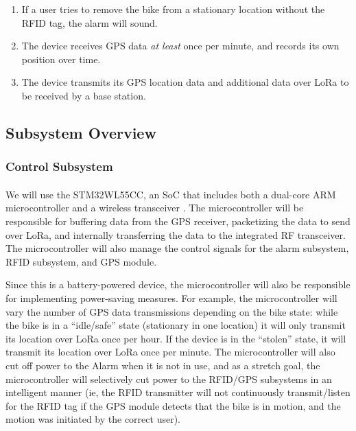\documentclass{article}
\begin{document}
\begin{enumerate}
	\item If a user tries to remove the bike from a stationary location without the RFID tag, the alarm will sound. 
	
	\item The device receives GPS data \textit{at least} once per minute, and records its own position over time.  
	
	\item The device transmits its GPS location data and additional data over LoRa to be received by a base station. 
	
\end{enumerate}

\subsection{Subsystem Overview}
\subsubsection{Control Subsystem}

\paragraph{}
 We will use the STM32WL55CC, an SoC that includes both a dual-core ARM microcontroller and a wireless transceiver \cite{stm_datasheet}. The microcontroller will be responsible for buffering data from the GPS receiver, packetizing the data to send over LoRa, and internally transferring the data to the integrated RF transceiver. The microcontroller will also manage the control signals for the alarm subsystem, RFID subsystem, and GPS module. 

 Since this is a battery-powered device, the microcontroller will also be responsible for implementing power-saving measures. For example, the microcontroller will vary the number of GPS data transmissions depending on the bike state: while the bike is in a “idle/safe” state (stationary in one location) it will only transmit its location over LoRa once per hour. If the device is in the “stolen” state, it will transmit its location over LoRa once per minute. The microcontroller will also cut off power to the Alarm when it is not in use, and as a stretch goal, the microcontroller will selectively cut power to the RFID/GPS subsystems in an intelligent manner (ie, the RFID transmitter will not continuously transmit/listen for the RFID tag if the GPS module detects that the bike is in motion, and the motion was initiated by the correct user). 
\end{document}
